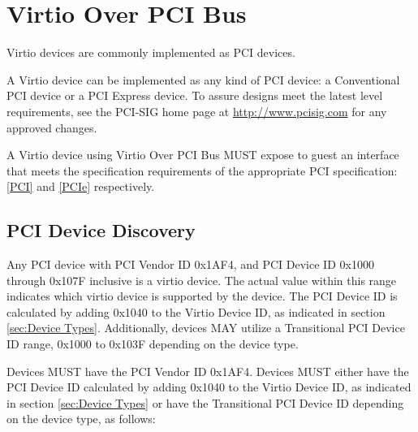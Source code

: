 \section{Virtio Over PCI Bus}\label{sec:Virtio Transport Options / Virtio Over PCI Bus}

Virtio devices are commonly implemented as PCI devices.

A Virtio device can be implemented as any kind of PCI device:
a Conventional PCI device or a PCI Express
device.  To assure designs meet the latest level
requirements, see
the PCI-SIG home page at \url{http://www.pcisig.com} for any
approved changes.

A Virtio device using Virtio Over PCI Bus MUST expose to
guest an interface that meets the specification requirements of
the appropriate PCI specification: \hyperref[intro:PCI]{[PCI]}
and \hyperref[intro:PCIe]{[PCIe]}
respectively.

\subsection{PCI Device Discovery}\label{sec:Virtio Transport Options / Virtio Over PCI Bus / PCI Device Discovery}

Any PCI device with PCI Vendor ID 0x1AF4, and PCI Device ID 0x1000 through
0x107F inclusive is a virtio device. The actual value within this range
indicates which virtio device is supported by the device.
The PCI Device ID is calculated by adding 0x1040 to the Virtio Device ID,
as indicated in section \ref{sec:Device Types}.
Additionally, devices MAY utilize a Transitional PCI Device ID range,
0x1000 to 0x103F depending on the device type.


Devices MUST have the PCI Vendor ID 0x1AF4.
Devices MUST either have the PCI Device ID calculated by adding 0x1040
to the Virtio Device ID, as indicated in section \ref{sec:Device
Types} or have the Transitional PCI Device ID depending on the device type,
as follows:

